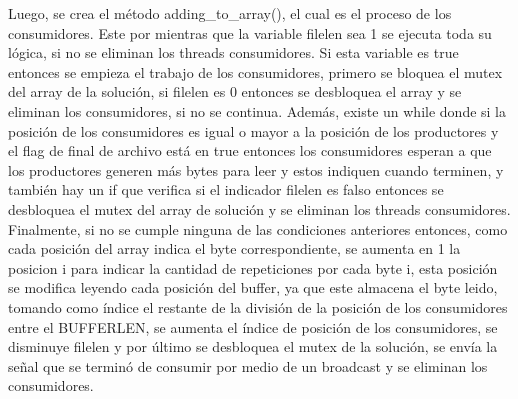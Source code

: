 \documentclass[12pt, article, natbib]{IEEEtran}
\begin{document}
Luego, se crea el método adding\_to\_array(), el cual es el proceso de los consumidores. Este por mientras que la variable filelen sea 1 se ejecuta toda su lógica, si no se eliminan los threads consumidores. Si esta variable es true entonces se empieza el trabajo de los consumidores, primero se bloquea el mutex del array de la solución, si filelen es 0 entonces se desbloquea el array y se eliminan los consumidores, si no se continua. Además, existe un while donde si la posición de los consumidores es igual o mayor a la posición de los productores y el flag de final de archivo está en true entonces los consumidores esperan a que los productores generen más bytes para leer y estos indiquen cuando terminen, y también hay un if que verifica si el indicador filelen es falso entonces se desbloquea el mutex del array de solución y se eliminan los threads consumidores. Finalmente, si no se cumple ninguna de las condiciones anteriores entonces, como cada posición del array indica el byte correspondiente, se aumenta en 1 la posicion i para indicar la cantidad de repeticiones por cada byte i, esta posición se modifica leyendo cada posición del buffer, ya que este almacena el byte leido, tomando como índice el restante de la división de la posición de los consumidores entre el BUFFERLEN, se aumenta el índice de posición de los consumidores, se disminuye filelen y por último se desbloquea el mutex de la solución, se envía la señal que se terminó de consumir por medio de un broadcast y se eliminan los consumidores.\\
\end{document}
